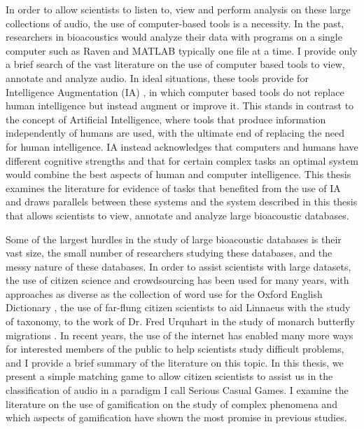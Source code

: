 \documentclass[12pt,oneside]{book}
\begin{document}
In order to allow scientists to listen to, view and perform analysis
on these large collections of audio, the use of computer-based tools
is a necessity.  In the past, researchers in bioacoustics would
analyze their data with programs on a single computer such as Raven
and MATLAB typically one file at a time.  I provide only a brief
search of the vast literature on the use of computer based tools to
view, annotate and analyze audio.  In ideal situations, these tools
provide for Intelligence Augmentation (IA)
\cite{biocca1996intelligence}, in which computer based tools do not
replace human intelligence but instead augment or improve it.  This
stands in contrast to the concept of Artificial Intelligence, where
tools that produce information independently of humans are used, with
the ultimate end of replacing the need for human intelligence.  IA
instead acknowledges that computers and humans have different
cognitive strengths and that for certain complex tasks an optimal
system would combine the best aspects of human and computer
intelligence.  This thesis examines the literature for evidence of
tasks that benefited from the use of IA and draws parallels between
these systems and the system described in this thesis that allows
scientists to view, annotate and analyze large bioacoustic databases.

Some of the largest hurdles in the study of large bioacoustic
databases is their vast size, the small number of researchers studying
these databases, and the messy nature of these databases.  In order to
assist scientists with large datasets, the use of citizen science and
crowdsourcing has been used for many years, with approaches as diverse
as the collection of word use for the Oxford English
Dictionary\cite{brody1999professor} \cite{goodchild2007world}, the use
of far-flung citizen scientists to aid Linnaeus with the study of
taxonomy\cite{linnaeus1758systema}, to the work of Dr. Fred Urquhart
in the study of monarch butterfly migrations\cite{howard2009fall}
\cite{oberhauser2008citizen}.  In recent years, the use of the
internet has enabled many more ways for interested members of the
public to help scientists study difficult problems, and I provide a
brief summary of the literature on this topic.  In this thesis, we
present a simple matching game to allow citizen scientists to assist
us in the classification of audio in a paradigm I call Serious Casual
Games.  I examine the literature on the use of gamification on the
study of complex phenomena and which aspects of gamification have shown
the most promise in previous studies.
\end{document}
